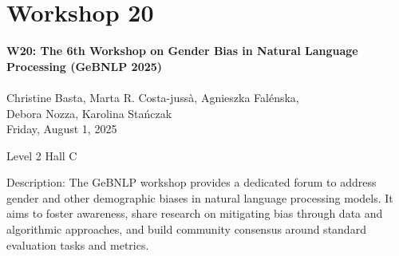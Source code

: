 \clearpage


\section[W20: The 6th Workshop on Gender Bias in Natural Language Processing (GeBNLP 2025)]{Workshop 20}
\label{workshop_20}

\begin{center}
    {\Large \textbf{W20: The 6th Workshop on Gender Bias in Natural Language Processing (GeBNLP 2025)}}\\
    
\\

Christine Basta, Marta R. Costa-jussà, Agnieszka Falénska, \\
Debora Nozza, Karolina Stańczak\\

    Friday, August 1, 2025
    
 Level 2 Hall C
\end{center}

Description: The GeBNLP workshop provides a dedicated forum to address gender and other demographic biases in natural language processing models. It aims to foster awareness, share research on mitigating bias through data and algorithmic approaches, and build community consensus around standard evaluation tasks and metrics.


